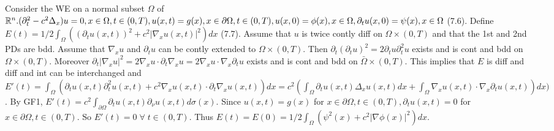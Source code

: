 Consider the WE on a normal subset $\Omega$ of $\mathbb{R}^n. (\partial_t^2 - c^2 \Delta_x)u = 0, x \in \Omega, t \in (0, T), u(x,t) = g(x), x \in \partial \Omega, t \in (0, T), u(x,0) = \phi(x), x \in \Omega, \partial_tu(x,0) = \psi(x), x \in \Omega$ (7.6). Define $E(t) = 1/2 \int_{\Omega}((\partial_tu(x,t))^2 + c^2|\nabla_xu(x,t)|^2)dx$ (7.7). 
Assume that $u$ is twice contly diff on $\Omega \times (0, T)$ and that the 1st and 2nd PDs are bdd.  Assume that $\nabla_x u$ and $\partial_t u$ can be contly extended to $\Omega \times (0, T)$. Then $\partial_t(\partial_tu)^2 = 2 \partial_tu \partial_t^2 u$ exists and is cont and bdd on $\Omega \times (0, T)$. Moreover $\partial_t |\nabla_xu|^2 = 2 \nabla_x u \cdot \partial_t \nabla_x u = 2 \nabla_x u \cdot \nabla_x \partial_t u$ exists and is cont and bdd on $\bar{\Omega} \times (0, T)$. This implies that $E$ is diff and diff and int can be interchanged and $E'(t) = \int_{\Omega}(\partial_tu(x,t)\partial_t^2u(x,t) + c^2 \nabla_x u(x,t)\cdot \partial_t \nabla_x u(x,t))dx = c^2(\int_{\Omega} \partial_t u(x,t) \Delta_x u(x,t)dx + \int_{\Omega} \nabla_xu(x,t)\cdot \nabla_x \partial_tu(x,t))dx)$. By GF1, $E'(t) = c^2 \int_{\partial \Omega}\partial_t u(x,t) \partial_{\nu} u(x,t) d\sigma(x)$. Since $u(x,t) = g(x)$ for $x \in \partial \Omega, t \in (0, T), \partial_t u(x,t)=0$ for $x \in \partial \Omega, t \in (0,T)$. So $E'(t) = 0\; \forall \; t \in (0, T)$. Thus $E(t) = E(0) = 1/2 \int_{\Omega} (\psi^2(x) + c^2|\nabla \phi(x)|^2)dx$. 